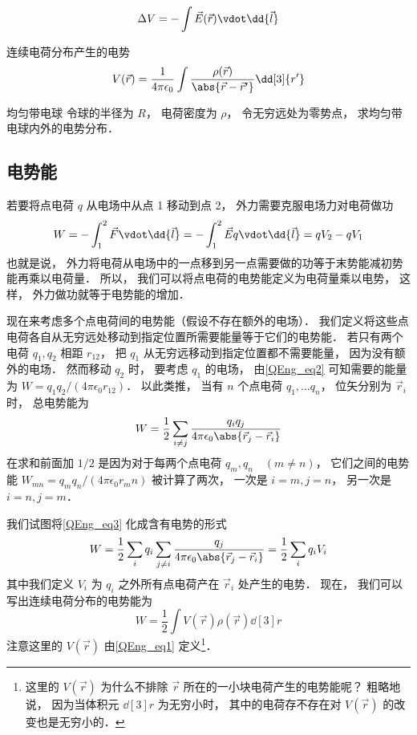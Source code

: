 
\begin{equation}
\Delta V = -\int \vec E(\vec r) \vdot \dd{\vec l}
\end{equation}

连续电荷分布产生的电势
\begin{equation}\label{QEng_eq1}
V(\vec r) = \frac{1}{4\pi\epsilon_0} \int \frac{\rho(\vec r)}{\abs{\vec r - \vec r'}} \dd[3]{r'}
\end{equation}

\begin{exam}{均匀带电球}
令球的半径为 $R$， 电荷密度为 $\rho$， 令无穷远处为零势点， 求均匀带电球内外的电势分布．

\end{exam}

\subsection{电势能}
若要将点电荷 $q$ 从电场中从点 1 移动到点 2， 外力需要克服电场力对电荷做功
\begin{equation}\label{QEng_eq2}
W = -\int_1^2 \vec F \vdot \dd{\vec l} = -\int_1^2 \vec E q \vdot \dd{\vec l}
= qV_2 - qV_1
\end{equation}
也就是说， 外力将电荷从电场中的一点移到另一点需要做的功等于末势能减初势能再乘以电荷量． 所以， 我们可以将点电荷的电势能定义为电荷量乘以电势， 这样， 外力做功就等于电势能的增加．

现在来考虑多个点电荷间的电势能（假设不存在额外的电场）． 我们定义将这些点电荷各自从无穷远处移动到指定位置所需要能量等于它们的电势能． 若只有两个电荷 $q_1, q_2$ 相距 $r_12$， 把 $q_1$ 从无穷远移动到指定位置都不需要能量， 因为没有额外的电场． 然而移动 $q_2$ 时， 要考虑 $q_1$ 的电场， 由\autoref{QEng_eq2} 可知需要的能量为 $W = q_1q_2/(4\pi\epsilon_0 r_12)$． 以此类推， 当有 $n$ 个点电荷 $q_1, \dots q_n$， 位矢分别为 $\vec r_i$ 时， 总电势能为
\begin{equation}\label{QEng_eq3}
W = \frac12\sum_{i \neq j} \frac{q_i q_j}{4\pi\epsilon_0 \abs{\vec r_j - \vec r_i}}
\end{equation}
在求和前面加 $1/2$ 是因为对于每两个点电荷 $q_m, q_n\quad (m \neq n)$， 它们之间的电势能 $W_{mn} = q_m q_n/(4\pi\epsilon_0 r_mn)$ 被计算了两次， 一次是 $i = m, j = n$， 另一次是 $i = n, j = m$．

我们试图将\autoref{QEng_eq3} 化成含有电势的形式
\begin{equation}
W = \frac12 \sum_i q_i \sum_{j\neq i} \frac{q_j}{4\pi\epsilon_0\abs{\vec r_j - \vec r_i}}
=\frac12 \sum_i q_i V_i
\end{equation}
其中我们定义 $V_i$ 为 $q_i$ 之外所有点电荷产在 $\vec r_i$ 处产生的电势． 现在， 我们可以写出连续电荷分布的电势能为
\begin{equation}\label{QEng_eq6}
W = \frac 12 \int V(\vec r) \rho(\vec r) \dd[3]{r}
\end{equation}
注意这里的 $V(\vec r)$ 由\autoref{QEng_eq1} 定义\footnote{这里的 $V(\vec r)$ 为什么不排除 $\vec r$ 所在的一小块电荷产生的电势能呢？ 粗略地说， 因为当体积元 $\dd[3]{r}$ 为无穷小时， 其中的电荷存不存在对 $V(\vec r)$ 的改变也是无穷小的．}．